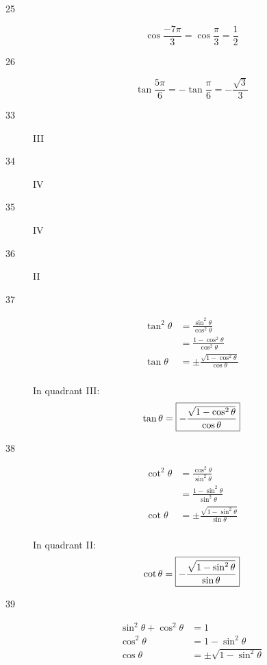 \documentclass{exam}
\begin{document}
\begin{description}
      \item[25]
        \[
          \cos \frac{-7 \pi}{3} = \cos \frac{\pi}{3} = \boxed{ \frac{1}{2} }
        \]

      \item[26]
        \[
          \tan \frac{5 \pi}{6} = - \tan \frac{\pi}{6} = \boxed{ - \frac{\sqrt{3}}{3} }
        \]

      \item[33] III
      \item[34] IV
      \item[35] IV
      \item[36] II

      \item[37]
        \begin{align*}
          \tan^2 \theta & = \frac{\sin^2 \theta}{\cos^2 \theta} \\
                        & = \frac{1 - \cos^2 \theta}{\cos^2 \theta} \\
          \tan \theta   & = \pm \frac{\sqrt{1 - \cos^2 \theta}}{\cos \theta} \\
        \end{align*}

        In quadrant III:
        \[
          \tan \theta = \boxed{ - \frac{\sqrt{1 - \cos^2 \theta}}{\cos \theta} } \\
        \]


      \item[38]
        \begin{align*}
          \cot^2 \theta & = \frac{\cos^2 \theta}{\sin^2 \theta} \\
                        & = \frac{1 - \sin^2 \theta}{\sin^2 \theta} \\
          \cot \theta   & = \pm \frac{\sqrt{1 - \sin^2 \theta}}{\sin \theta} \\
        \end{align*}

        In quadrant II:
        \[
          \cot \theta = \boxed{ - \frac{\sqrt{1 - \sin^2 \theta}}{\sin \theta} } \\
        \]

      \item[39]
        \begin{align*}
          \sin^2 \theta + \cos^2 \theta & = 1 \\
          \cos^2 \theta                 & = 1 - \sin^2 \theta \\
          \cos \theta                   & = \pm \sqrt{ 1 - \sin^2 \theta } \\
        \end{align*}


\end{description}
\end{document}
